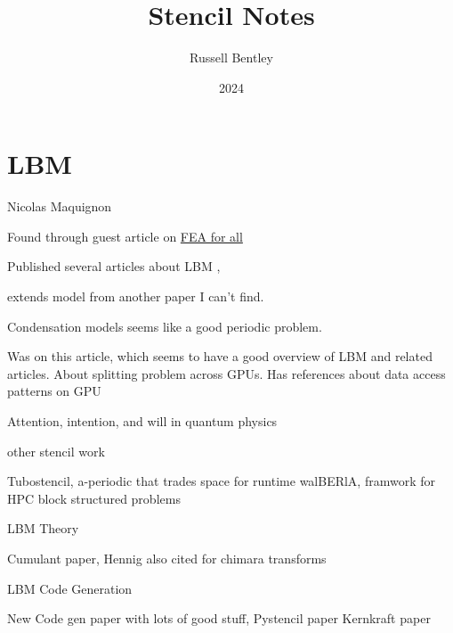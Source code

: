 \documentclass{beamer}
\title{Stencil Notes}
\author{Russell Bentley}
\institute{Stony Brook}
\date{2024}
\begin{document}
\frame{\titlepage}

\section{LBM}
\begin{frame}{Nicolas Maquignon}
  \begin{outline}
    \1 Found through guest article on 
    \href{https://feaforall.com/implementation-lattice-boltzmann-method-lbm/}{FEA for all}

    \1 Published several articles about LBM \cite{Maquignon2014}, \cite{Maquignon2022}

    \2 \cite{Maquignon2014} extends model from another paper I can't find.
      
    \2 Condensation models seems like a good periodic problem.

    \1 Was on this article, which seems to have a good overview of LBM and related articles. 
    About splitting problem across GPUs.
    Has references about data access patterns on GPU
    \cite{Duchateau2015}
  \end{outline}
\end{frame}

\begin{frame}
  \begin{outline}
    \1 Attention, intention, and will in quantum physics \cite{Stapp1999}
  \end{outline}
\end{frame}

\begin{frame}{other stencil work}
  \begin{outline}
    \1 Tubostencil, a-periodic that trades space for runtime \cite{Liu2023turbo}
    \2 walBERlA, framwork for HPC block structured problems \cite{Bauer2021}
  \end{outline}
\end{frame}

\begin{frame}{LBM Theory}
  \begin{outline}
    \1 Cumulant paper, Hennig also cited for chimara transforms \cite{Geier2015}
  \end{outline}
\end{frame}

\begin{frame}{LBM Code Generation}
  \begin{outline}
    \1 New Code gen paper with lots of good stuff, \cite{Suffa2024}
    \1 Pystencil paper \cite{Bauer2019}
    \1 Kernkraft paper \cite{Hammer2017}
  \end{outline}
\end{frame}
\end{document}
